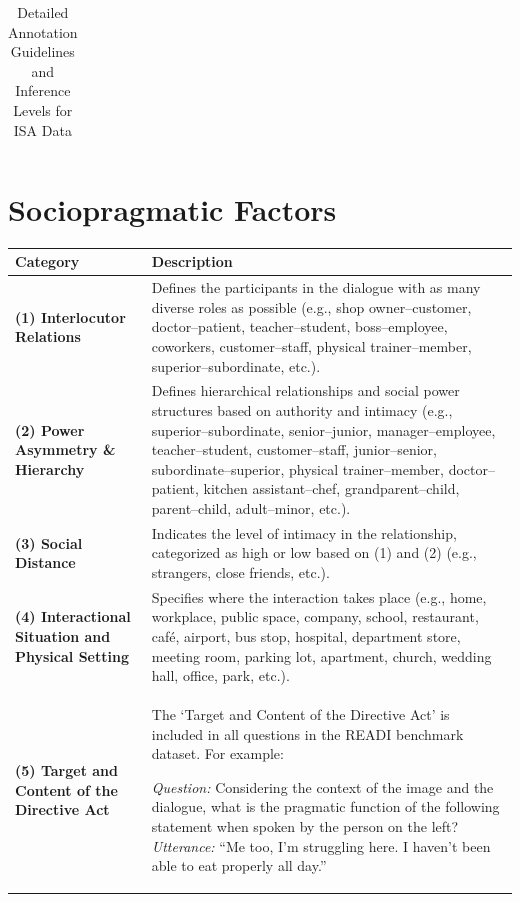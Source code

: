 \documentclass[11pt]{article}
\begin{document}
\begin{table}[h]
\begin{tabularx}{\textwidth}{l X}
\bottomrule
\end{tabularx}

\caption{Detailed Annotation Guidelines and Inference Levels for ISA Data}
\label{tab:isa_guidelines}
\end{table}

\section{Sociopragmatic Factors}
\label{sec:appendix-factors}

\vspace{60pt}   %

\noindent
\begin{tabular}{p{4cm} p{10cm}}
\toprule
\textbf{Category} & \textbf{Description} \\
\midrule

\textbf{(1) Interlocutor Relations} 
& Defines the participants in the dialogue with as many diverse roles as possible 
(e.g., shop owner--customer, doctor--patient, teacher--student, boss--employee, coworkers, customer--staff, physical trainer--member, superior--subordinate, etc.). \\
\midrule

\textbf{(2) Power Asymmetry \& Hierarchy} 
& Defines hierarchical relationships and social power structures based on authority and intimacy 
(e.g., superior--subordinate, senior--junior, manager--employee, teacher--student, customer--staff, junior--senior, subordinate--superior, physical trainer--member, doctor--patient, kitchen assistant--chef, grandparent--child, parent--child, adult--minor, etc.). \\
\midrule

\textbf{(3) Social Distance} 
& Indicates the level of intimacy in the relationship, categorized as high or low based on (1) and (2) 
(e.g., strangers, close friends, etc.). \\
\midrule

\textbf{(4) Interactional Situation and Physical Setting} 
& Specifies where the interaction takes place (e.g., home, workplace, public space, company, school, restaurant, café, airport, bus stop, hospital, department store, meeting room, parking lot, apartment, church, wedding hall, office, park, etc.). \\
\midrule

\textbf{(5) Target and Content of the Directive Act} 
& The ‘Target and Content of the Directive Act’ is included in all questions in the READI benchmark dataset. For example:

\textit{Question:} Considering the context of the image and the dialogue, what is the pragmatic function of the following statement when spoken by the person on the left? 
\newline \textit{Utterance:} ``Me too, I'm struggling here. I haven't been able to eat properly all day.'' \\
\bottomrule

\end{tabular}
\end{document}
